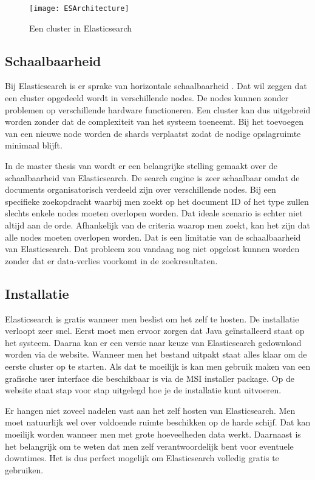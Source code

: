 \begin{figure}
	\centering
	\texttt{[image: ESArchitecture]}
	\caption{Een cluster in Elasticsearch}
	\label{fig:ESArchitecture}
\end{figure}

\subsection{Schaalbaarheid}

Bij Elasticsearch is er sprake van horizontale schaalbaarheid \autocite{Dixit2016}. Dat wil zeggen dat een cluster opgedeeld wordt in verschillende nodes. De nodes kunnen zonder problemen op verschillende hardware functioneren. Een cluster kan dus uitgebreid worden zonder dat de complexiteit van het systeem toeneemt. Bij het toevoegen van een nieuwe node worden de shards verplaatst zodat de nodige opslagruimte minimaal blijft.

In de master thesis van \textcite{Berglund2013} wordt er een belangrijke stelling gemaakt over de schaalbaarheid van Elasticsearch. De search engine is zeer schaalbaar omdat de documents organisatorisch verdeeld zijn over verschillende nodes. Bij een specifieke zoekopdracht waarbij men zoekt op het document ID of het type zullen slechts enkele nodes moeten overlopen worden. Dat ideale scenario is echter niet altijd aan de orde. Afhankelijk van de criteria waarop men zoekt, kan het zijn dat alle nodes moeten overlopen worden. Dat is een limitatie van de schaalbaarheid van Elasticsearch. Dat probleem zou vandaag nog niet opgelost kunnen worden zonder dat er data-verlies voorkomt in de zoekresultaten. 

\subsection{Installatie}
\label{Installatie}

Elasticsearch is gratis wanneer men beslist om het zelf te hosten. De installatie verloopt zeer snel. Eerst moet men ervoor zorgen dat Java geïnstalleerd staat op het systeem. Daarna kan er een versie naar keuze van Elasticsearch gedownload worden via de website. Wanneer men het bestand uitpakt staat alles klaar om de eerste cluster op te starten. Als dat te moeilijk is kan men gebruik maken van een grafische user interface die beschikbaar is via de MSI installer package. Op de website staat stap voor stap uitgelegd hoe je de installatie kunt uitvoeren. 

Er hangen niet zoveel nadelen vast aan het zelf hosten van Elasticsearch. Men moet natuurlijk wel over voldoende ruimte beschikken op de harde schijf. Dat kan moeilijk worden wanneer men met grote hoeveelheden data werkt. Daarnaast is het belangrijk om te weten dat men zelf verantwoordelijk bent voor eventuele downtimes. Het is dus perfect mogelijk om Elasticsearch volledig gratis te gebruiken. 

